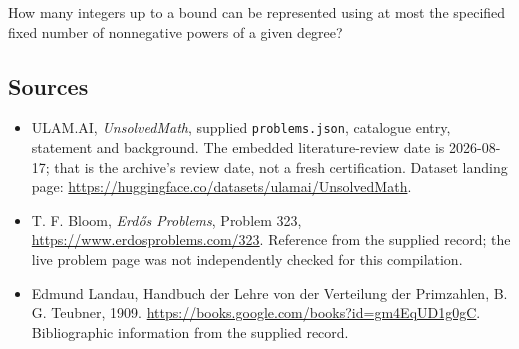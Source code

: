 \documentclass[11pt,a4paper]{article}
\begin{document}
How many integers up to a bound can be represented using at most the specified fixed number of nonnegative powers of a given degree?

\subsection{Sources}

{\small

\begin{itemize}

\item[\hypertarget{source:statement:1}{S1}] ULAM.AI, \emph{UnsolvedMath}, supplied \texttt{problems.json}, catalogue entry, statement and background. The embedded literature-review date is 2026-08-17; that is the archive’s review date, not a fresh certification. Dataset landing page: \url{https://huggingface.co/datasets/ulamai/UnsolvedMath}.

\item[\hypertarget{source:statement:2}{S2}] T. F. Bloom, \emph{Erdős Problems}, Problem 323, \url{https://www.erdosproblems.com/323}. Reference from the supplied record; the live problem page was not independently checked for this compilation.

\item[\hypertarget{source:statement:3}{S3}] Edmund Landau, Handbuch der Lehre von der Verteilung der Primzahlen, B. G. Teubner, 1909. \url{https://books.google.com/books?id=gm4EqUD1g0gC}. Bibliographic information from the supplied record.

\end{itemize}

}

\label{end:statement}
\end{document}
